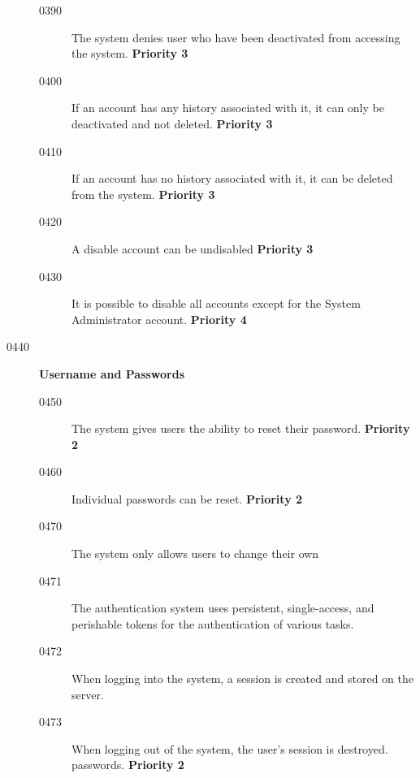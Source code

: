 \documentclass{article}
\begin{document}
\begin{description}
    \begin{description}

    \item[0390] The system denies user who have been deactivated from
      accessing the system. \textbf{Priority 3}
    \item[0400] If an account has any history associated with it, it can only
      be deactivated and not deleted. \textbf{Priority 3}
    \item[0410] If an account has no history associated with it, it can be
      deleted from the system. \textbf{Priority 3}
    \item[0420] A disable account can be undisabled \textbf{Priority 3}
    \item[0430] It is possible to disable all accounts except for the System
      Administrator account. \textbf{Priority 4}
    \end{description}

\item[0440] \textbf{Username and Passwords}

  \begin{description}

  \item[0450] The system gives users the ability to reset their password. \textbf{Priority 2}
  \item[0460] Individual passwords can be reset. \textbf{Priority 2}
  \item[0470] The system only allows users to change their own
  \item[0471] The authentication system uses persistent, single-access,
    and perishable tokens for the authentication of various tasks. 
  \item[0472] When logging into the system, a session is created and stored
    on the server.
  \item[0473] When logging out of the system, the user's session is destroyed.
  passwords. \textbf{Priority 2}

  \end{description}

\end{description}
\end{document}
